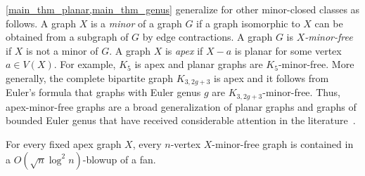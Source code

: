 \documentclass{patmorin}
\newcommand{\david}[1]{{\color{orange} David: #1}}
\newcommand{\pat}[1]{\textcolor{Blue}{Pat: #1}}
\newcommand{\defin}[1]{\emph{\textcolor{brightmaroon}{#1}}}
\begin{document}
\cref{main_thm_planar,main_thm_genus} generalize for other minor-closed classes as follows. A graph $X$ is a \defin{minor} of a graph $G$ if a graph isomorphic to $X$ can be obtained from a subgraph of $G$ by edge contractions. A graph $G$ is \defin{$X$-minor-free} if $X$ is not a minor of $G$. A graph $X$ is \defin{apex} if $X-a$ is planar for some vertex $a\in V(X)$. For example, $K_5$ is apex and planar graphs are $K_5$-minor-free. More generally, the complete bipartite graph $K_{3,2g+3}$ is apex and it follows from Euler's formula that graphs with Euler genus $g$ are $K_{3,2g+3}$-minor-free. Thus, apex-minor-free graphs are a broad generalization of planar graphs and graphs of bounded Euler genus that have received considerable attention in the literature~\citep{demaine.hajiaghayi.ea:approximation,dragan.fomin.ea:ptas,fomin.lokshtanov.ea:subexponetial,dvorak.thomas:list,korhonen.nadara.ea:fully}.


\begin{thm}\label{main_thm_apexmf}
For every fixed apex graph $X$, every $n$-vertex $X$-minor-free graph is contained in a $O(\sqrt{n}\log^2 n)$-blowup of a fan.
\end{thm}

\end{document}
